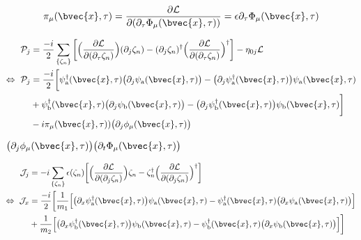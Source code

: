 %
\begin{align}
	\pi_{\mu}(\bvec{x},\tau) = \frac{\partial \mathcal{L}}{\partial(\partial_{\tau} \Phi_{\mu}(\bvec{x},\tau))} = \epsilon \partial_{\tau} \Phi_{\mu}(\bvec{x},\tau)
\end{align}
%






%
\begin{align}
	\mathcal{P}_{j} &= 
		\frac{-i}{2} \sum\limits_{\{\zeta_{n}\}} \bigg[ 
		\Big(\frac{\partial\mathcal{L}}{\partial(\partial_{\tau}\zeta_{n})}\Big) (\partial_{j}\zeta_{n}) 
		-
		(\partial_{j}\zeta_{n})^{\dag} \Big(\frac{\partial\mathcal{L}}{\partial(\partial_{\tau}\zeta_{n})}\Big)^{\dag}
		\bigg]
		-
		\eta_{0j}\mathcal{L}
		\notag \\
	\Leftrightarrow\ \mathcal{P}_{j} &= 
		\frac{-i}{2} \bigg[
			\psi_{\mathrm{a}}^{\dag}(\bvec{x},\tau) \big(\partial_{j} \psi_{\mathrm{a}}(\bvec{x},\tau)\big)
			- 
			\big(\partial_{j} \psi_{\mathrm{a}}^{\dag}(\bvec{x},\tau)\big) \psi_{\mathrm{a}}(\bvec{x},\tau)
			\\&
			+
			\psi_{\mathrm{b}}^{\dag}(\bvec{x},\tau) \big(\partial_{j} \psi_{\mathrm{b}}(\bvec{x},\tau)\big)
			- 
			\big(\partial_{j} \psi_{\mathrm{b}}^{\dag}(\bvec{x},\tau)\big) \psi_{\mathrm{b}}(\bvec{x},\tau)
		\bigg]
	\\&
	- 
	i\pi_{\mu}(\bvec{x},\tau)) \big(\partial_{j} \phi_{\mu}(\bvec{x},\tau)\big)
\end{align}
%

$\big(\partial_{j} \phi_{\mu}(\bvec{x},\tau)\big) \big(\partial_{t}\Phi_{\mu}(\bvec{x},\tau)\big)$



%
\begin{align}
	\mathcal{J}_{j} &= 
		-i \sum\limits_{\{\zeta_{n}\}} \epsilon(\zeta_{n}) \bigg[
			\Big(\frac{\partial\mathcal{L}}{\partial(\partial_{j}\zeta_{n})}\Big) \zeta_{n}
			-
			\zeta_{n}^{\dag} \Big(\frac{\partial\mathcal{L}}{\partial(\partial_{j}\zeta_{n})}\Big)^{\dag}
		\bigg]
	\notag \\
	\Leftrightarrow\ \mathcal{J}_{x} &=
		\frac{-i}{2} \bigg[
		\frac{1}{m_{1}} \Big[
			\big(\partial_{x} \psi_{\mathrm{a}}^{\dag}(\bvec{x},\tau)\big) \psi_{\mathrm{a}}(\bvec{x},\tau)
			-
			\psi_{\mathrm{a}}^{\dag}(\bvec{x},\tau) \big(\partial_{x} \psi_{\mathrm{a}}(\bvec{x},\tau)\big)
		\Big]
		\notag \\&
		+
		\frac{1}{m_{2}} \Big[
			\big(\partial_{x} \psi_{\mathrm{b}}^{\dag}(\bvec{x},\tau)\big) \psi_{\mathrm{b}}(\bvec{x},\tau)
			-
			\psi_{\mathrm{b}}^{\dag}(\bvec{x},\tau) \big(\partial_{x} \psi_{\mathrm{b}}(\bvec{x},\tau)\big)
		\Big]
		\bigg]
\end{align}
%



